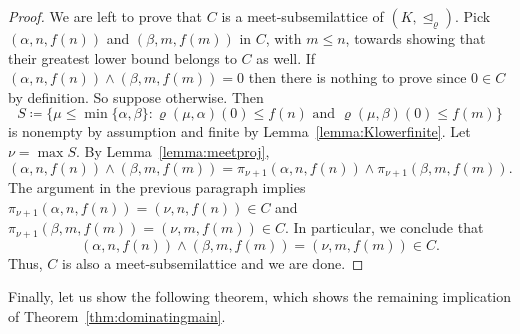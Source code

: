 \documentclass[]{amsart}
\theoremstyle{definition}
\theoremstyle{remark}
\begin{document}
\begin{proof}
We are left to prove that $C$ is a meet-subsemilattice of $(K, \trianglelefteq_\varrho)$. Pick $(\alpha, n, f(n))$ and $(\beta, m, f(m))$ in $C$, with $m \le n$, towards showing that their greatest lower bound belongs to $C$ as well. If $(\alpha, n, f(n)) \wedge (\beta, m, f(m)) = 0$ then there is nothing to prove since $0 \in C$ by definition. So suppose otherwise. Then
\[
S \coloneqq \big\{\mu \le \min \{\alpha, \beta\} : \varrho(\mu, \alpha)(0) \le f(n) \text{ and } \varrho(\mu, \beta)(0) \le f(m)\big\}
\]
is nonempty by assumption and finite by Lemma~\ref{lemma:Klowerfinite}. Let $\nu = \max S$. By Lemma~\ref{lemma:meetproj}, 
\[
(\alpha, n, f(n)) \wedge (\beta, m, f(m)) = \pi_{\nu + 1} (\alpha, n, f(n)) \wedge \pi_{\nu + 1} (\beta, m, f(m)).
\]
The argument in the previous paragraph implies $\pi_{\nu + 1} (\alpha, n, f(n))  = (\nu, n, f(n)) \in C$ and $\pi_{\nu + 1} (\beta, m, f(m))  = (\nu, m, f(m)) \in C$. In particular, we conclude that 
\[
(\alpha, n, f(n)) \wedge (\beta, m, f(m)) = (\nu, m, f(m)) \in C.
\]
Thus, $C$ is also a meet-subsemilattice and we are done. 
\end{proof}

Finally, let us show the following theorem, which shows the remaining implication of Theorem~\ref{thm:dominatingmain}.
\end{document}
